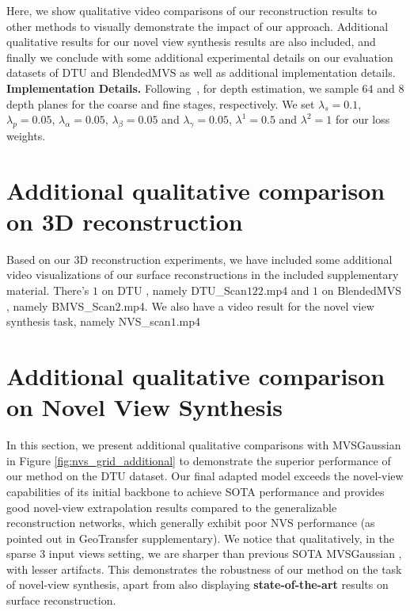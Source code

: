 Here, we show qualitative video comparisons of our reconstruction results to other methods to visually demonstrate the impact of our approach. Additional qualitative results for our novel view synthesis results are also included, and finally we conclude with some additional experimental details on our evaluation datasets of DTU \cite{aanaes2016large} and BlendedMVS \cite{yao2020blendedmvs} as well as additional implementation details.
\\
\noindent \textbf{Implementation Details.}
Following~\cite{liu2024fast}, for depth estimation, we sample $64$ and $8$ depth planes for the coarse and fine stages, respectively.
We set $\lambda_s=0.1$, $\lambda_p=0.05$, $\lambda_\alpha=0.05$, $\lambda_\beta=0.05$ and $\lambda_\gamma=0.05$, $\lambda^1=0.5$ and $\lambda^2=1$ for our loss weights.

\section{Additional qualitative comparison on 3D reconstruction}
Based on our $3$D reconstruction experiments, we have included some additional video visualizations of our surface reconstructions in the included supplementary material. There's $1$ on DTU \cite{aanaes2016large}, namely DTU\_Scan$122$.mp4 and $1$ on BlendedMVS \cite{yao2020blendedmvs}, namely BMVS\_Scan$2$.mp4. We also have a video result for the novel view synthesis task, namely NVS\_scan$1$.mp4

\section{Additional qualitative comparison on Novel View Synthesis}
In this section, we present additional qualitative comparisons with MVSGaussian \cite{liu2024fast} in Figure \ref{fig:nvs_grid_additional} to demonstrate the superior performance of our method on the DTU \cite{aanaes2016large} dataset. Our final adapted model exceeds the novel-view capabilities of its initial backbone to achieve SOTA performance and provides good novel-view extrapolation results compared to the generalizable reconstruction networks, which generally exhibit poor NVS performance (as pointed out in GeoTransfer \cite{jena2024geotransfer} supplementary). We notice that qualitatively, in the sparse $3$ input views setting, we are sharper than previous SOTA MVSGaussian \cite{liu2024fast}, with lesser artifacts. This demonstrates the robustness of our method on the task of novel-view synthesis, apart from also displaying \textbf{state-of-the-art} results on surface reconstruction. 

